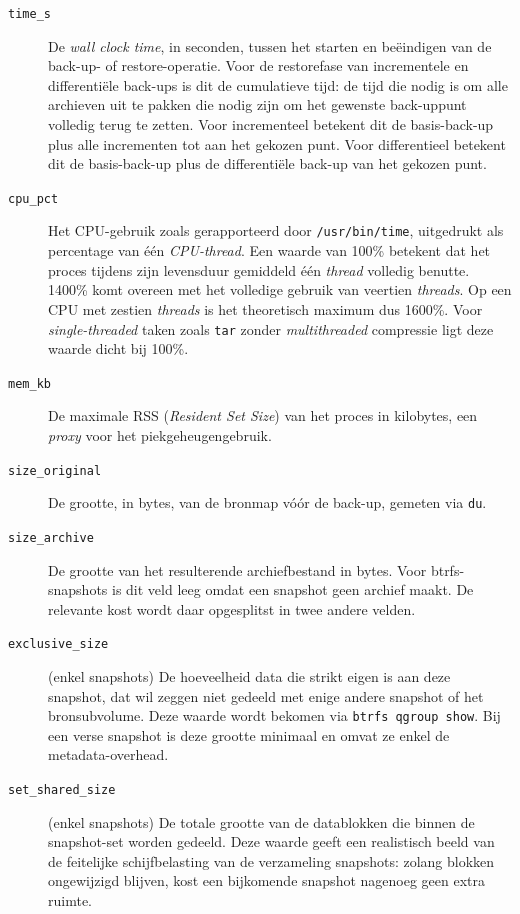 \begin{description}
    \item[\texttt{time\_s}] De \textit{wall clock time}, in seconden, tussen het starten en beëindigen van de back-up- of restore-operatie. Voor de restorefase van incrementele en differentiële back-ups is dit de cumulatieve tijd: de tijd die nodig is om alle archieven uit te pakken die nodig zijn om het gewenste back-uppunt volledig terug te zetten. Voor incrementeel betekent dit de basis-back-up plus alle incrementen tot aan het gekozen punt. Voor differentieel betekent dit de basis-back-up plus de differentiële back-up van het gekozen punt.
    \item[\texttt{cpu\_pct}] Het CPU-gebruik zoals gerapporteerd door \texttt{/usr/bin/time}, uitgedrukt als percentage van één \textit{CPU-thread}. Een waarde van 100\% betekent dat het proces tijdens zijn levensduur gemiddeld één \textit{thread} volledig benutte. 1400\% komt overeen met het volledige gebruik van veertien \textit{threads}. Op een CPU met zestien \textit{threads} is het theoretisch maximum dus 1600\%. Voor \textit{single-threaded} taken zoals \texttt{tar} zonder \textit{multithreaded} compressie ligt deze waarde dicht bij 100\%.
    \item[\texttt{mem\_kb}] De maximale RSS (\textit{Resident Set Size}) van het proces in kilobytes, een \textit{proxy} voor het piekgeheugengebruik.
    \item[\texttt{size\_original}] De grootte, in bytes, van de bronmap vóór de back-up, gemeten via \texttt{du}.
    \item[\texttt{size\_archive}] De grootte van het resulterende archiefbestand in bytes. Voor btrfs-snapshots is dit veld leeg omdat een snapshot geen archief maakt. De relevante kost wordt daar opgesplitst in twee andere velden.
    \item[\texttt{exclusive\_size}] (enkel snapshots) De hoeveelheid data die strikt eigen is aan deze snapshot, dat wil zeggen niet gedeeld met enige andere snapshot of het bronsubvolume. Deze waarde wordt bekomen via \texttt{btrfs qgroup show}. Bij een verse snapshot is deze grootte minimaal en omvat ze enkel de metadata-overhead.
    \item[\texttt{set\_shared\_size}] (enkel snapshots) De totale grootte van de datablokken die binnen de snapshot-set worden gedeeld. Deze waarde geeft een realistisch beeld van de feitelijke schijfbelasting van de verzameling snapshots: zolang blokken ongewijzigd blijven, kost een bijkomende snapshot nagenoeg geen extra ruimte.
\end{description}


